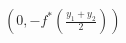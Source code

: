 \documentclass[preview]{standalone}
\begin{document}
\begin{center}
$(0, -f^*(\frac{y_1 + y_2}{2}))$
\end{center}
\end{document}
